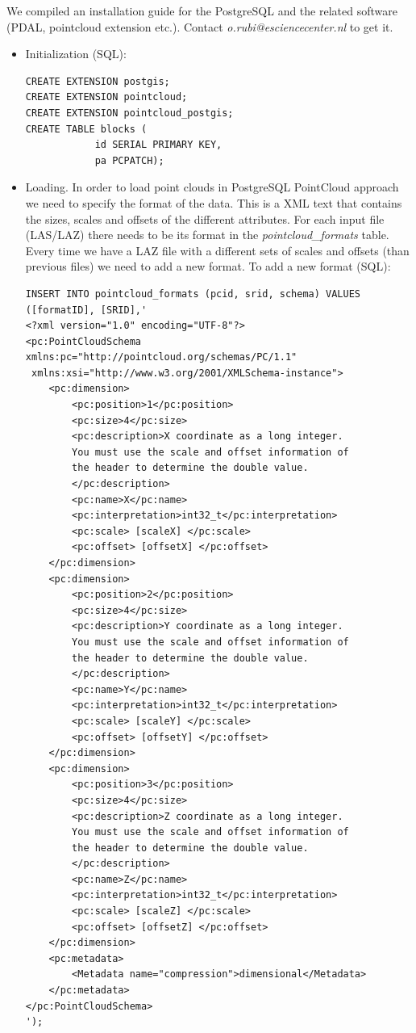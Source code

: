 \documentclass[a4paper,11pt]{article}
\begin{document}
We compiled an installation guide for the PostgreSQL and the related software (PDAL, pointcloud extension etc.). Contact \textit{o.rubi@esciencecenter.nl} to get it.

\begin{itemize}
	\item Initialization (SQL):
\begin{verbatim}
CREATE EXTENSION postgis;
CREATE EXTENSION pointcloud;
CREATE EXTENSION pointcloud_postgis;
CREATE TABLE blocks (
            id SERIAL PRIMARY KEY,
            pa PCPATCH);
\end{verbatim}

	\item Loading. In order to load point clouds in PostgreSQL PointCloud approach we need to specify the format of the data. This is a XML text that contains the sizes, scales and offsets of the different attributes. For each input file (LAS/LAZ) there needs to be its format in the \textit{pointcloud\_formats} table. Every time we have a LAZ file with a different sets of scales and offsets (than previous files) we need to add a new format. To add a new format (SQL):

\begin{verbatim}            
INSERT INTO pointcloud_formats (pcid, srid, schema) VALUES ([formatID], [SRID],'
<?xml version="1.0" encoding="UTF-8"?>
<pc:PointCloudSchema xmlns:pc="http://pointcloud.org/schemas/PC/1.1"
 xmlns:xsi="http://www.w3.org/2001/XMLSchema-instance">
    <pc:dimension>
        <pc:position>1</pc:position>
        <pc:size>4</pc:size>
        <pc:description>X coordinate as a long integer. 
        You must use the scale and offset information of 
        the header to determine the double value.
        </pc:description>
        <pc:name>X</pc:name>
        <pc:interpretation>int32_t</pc:interpretation>
        <pc:scale> [scaleX] </pc:scale>
        <pc:offset> [offsetX] </pc:offset>
    </pc:dimension>
    <pc:dimension>
        <pc:position>2</pc:position>
        <pc:size>4</pc:size>
        <pc:description>Y coordinate as a long integer. 
        You must use the scale and offset information of 
        the header to determine the double value.
        </pc:description>
        <pc:name>Y</pc:name>
        <pc:interpretation>int32_t</pc:interpretation>
        <pc:scale> [scaleY] </pc:scale>
        <pc:offset> [offsetY] </pc:offset>
    </pc:dimension>
    <pc:dimension>
        <pc:position>3</pc:position>
        <pc:size>4</pc:size>
        <pc:description>Z coordinate as a long integer. 
        You must use the scale and offset information of 
        the header to determine the double value.
        </pc:description>
        <pc:name>Z</pc:name>
        <pc:interpretation>int32_t</pc:interpretation>
        <pc:scale> [scaleZ] </pc:scale>
        <pc:offset> [offsetZ] </pc:offset>
    </pc:dimension>
    <pc:metadata>
        <Metadata name="compression">dimensional</Metadata>
    </pc:metadata>
</pc:PointCloudSchema>
');
\end{verbatim}


\end{itemize}
\end{document}

